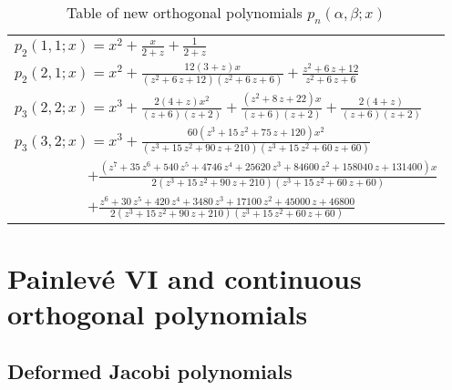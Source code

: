 \documentclass[12pt]{article}
\def\P{Painlev\'e }
\numberwithin{figure}{section}
\numberwithin{equation}{section}
\numberwithin{table}{section}
\begin{document}
\begin{table}[!htb]
\centering\caption{Table of new orthogonal polynomials $p_n(\alpha,\beta;x)$} %
\centering
\begin{tabular}{l}
\hline
$p_{{2}}(1,1;x)={x}^{2}+{\frac {x}{2+z}}+ \frac{1}{2+z}$\\
$p_{{2}}(2,1;x)={x}^{2}+{\frac { 12\left( 3+z \right) x}{ \left( {z}^{2}+6\,
z+12 \right)  \left( {z}^{2}+6\,z+6 \right) }}+{\frac {{z}^{2}+6\,z+12
}{{z}^{2}+6\,z+6}}
$\\
$p_{{3}}(2,2;x)={x}^{3}+{\frac { 2\left( 4+z \right) {x}^{2}}{ \left( z+6
 \right)  \left( z+2 \right) }}+{\frac { \left( {z}^{2}+8\,z+22
 \right) x}{ \left( z+6 \right)  \left( z+2 \right) }}+{\frac {2(4+z)}
{ \left( z+6 \right)  \left( z+2 \right) }}
$\\
$p_{{3}}(3,2;x)={x}^{3}+{\frac { 60\left( {z}^{3}+15\,{z}^{2}+75\,z+120
 \right) {x}^{2}}{ \left( {z}^{3}+15\,{z}^{2}+90\,z+210 \right)
 \left( {z}^{3}+15\,{z}^{2}+60\,z+60 \right) }}
 $\\~~~~~~~~~~$+{\frac { \left( {
z}^{7}+35\,{z}^{6}+540\,{z}^{5}+4746\,{z}^{4}+25620\,{z}^{3}+84600\,{z
}^{2}+158040\,z+131400 \right) x}{ 2\left( {z}^{3}+15\,{z}^{2}+90\,z+
210 \right)  \left( {z}^{3}+15\,{z}^{2}+60\,z+60 \right) }}
$\\~~~~~~~~~~$+{
\frac {{z}^{6}+30\,{z}^{5}+420\,{z}^{4}+3480\,{z}^{3}+17100\,{z}^{2}+
45000\,z+46800}{ 2\left( {z}^{3}+15\,{z}^{2}+90\,z+210 \right)  \left(
{z}^{3}+15\,{z}^{2}+60\,z+60 \right) }}$\\
\hline
\end{tabular}
\label{table:nonlin}
\end{table}

\section{\P VI and continuous orthogonal polynomials}
\subsection{Deformed Jacobi polynomials}
\end{document}
